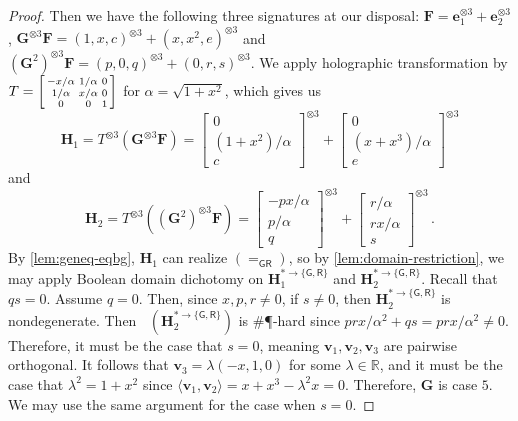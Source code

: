 \documentclass[11pt]{article}
\DeclareMathOperator{\holbs}{Holant^*_2}
\newcommand{\dg}{\mathsf{G}}
\newcommand{\dr}{\mathsf{R}}
\newcommand{\sph}{\#\P-hard\xspace}
\newcommand{\teh}{^{\otimes 3}}
\newcommand{\domres}[1]{
  ^{*\to\{#1\}}
}
\begin{document}
\begin{proof}
  Then we have the following three signatures at our disposal:
  $\mathbf{F} = \mathbf{e}_1 \teh + \mathbf{e}_2 \teh$, $\mathbf{G}\teh \mathbf{F} = (1, x, c)\teh + (x, x^2, e)\teh$ and $(\mathbf{G}^2)\teh \mathbf{F} = (p, 0, q) \teh + (0, r, s)\teh$.
  We apply holographic transformation by $T =
  \begin{bsmallmatrix}
    -x/\alpha & 1/\alpha & 0 \\
    1/\alpha & x/\alpha & 0 \\
    0 & 0 & 1
  \end{bsmallmatrix}$ for $\alpha = \sqrt{1 + x^2}$, which gives us 
  \[
    \mathbf{H}_1 = 
    T \teh (\mathbf{G} \teh \mathbf{F}) = \begin{bmatrix}
      0 \\ (1 + x^2)/\alpha \\ c
      \end{bmatrix}\teh + \begin{bmatrix}
      0 \\ (x + x^3)/\alpha \\ e
    \end{bmatrix}\teh
  \]
  and
  \[
    \mathbf{H}_2 = 
    T\teh ( (\mathbf{G}^2)\teh \mathbf{F}) = \begin{bmatrix}
      -px/\alpha \\ p/\alpha \\ q
      \end{bmatrix}\teh + \begin{bmatrix}
      r/\alpha \\ rx/\alpha \\ s
    \end{bmatrix}\teh
    \, .
  \]
  By \cref{lem:geneq-eqbg},  $\mathbf{H}_1$ can realize $(=_{\dg \dr})$, so by \cref{lem:domain-restriction}, we may apply Boolean domain dichotomy on 
  $\mathbf{H}_1\domres{\dg, \dr}$ and $\mathbf{H}_2\domres{\dg, \dr}$.
Recall that $qs = 0$.
  Assume $q = 0$.
Then, since $x, p, r \ne 0$, if $s \ne 0$, then $\mathbf{H}_2\domres{\dg, \dr}$ is nondegenerate.
  Then $\holbs(\mathbf{H}_2\domres{\dg, \dr})$ is \sph  since $prx/\alpha^2 + q s = prx/\alpha^2  \ne 0$.
  Therefore, it must be the case that $s = 0$, meaning $\mathbf{v}_1, \mathbf{v}_2, \mathbf{v}_3$ are pairwise orthogonal.
  It follows that $\mathbf{v}_3 = \lambda(-x, 1, 0)$ for some $\lambda \in \mathbb{R}$, and it must be the case that $\lambda^2 = 1 + x^2$ since $\langle \mathbf{v}_1, \mathbf{v}_2  \rangle = x + x^3 - \lambda^2 x = 0$.
  Therefore, $\mathbf{G}$ is case $5$.
  We may use the same argument for the case when $s = 0$.
\end{proof}
\end{document}
